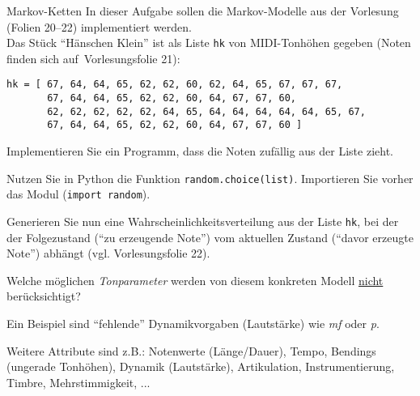 \documentclass{uebungsblatt}
\begin{document}
\begin{aufgabe}{Markov-Ketten}
	In dieser Aufgabe sollen die Markov-Modelle aus der Vorlesung (Folien 20--22) implementiert werden.\\
	Das Stück \enquote{Hänschen Klein} ist als Liste \texttt{hk} von MIDI-Tonhöhen gegeben (Noten finden sich auf~Vorlesungsfolie 21):
	\medskip
	
	\verb|hk = [ 67, 64, 64, 65, 62, 62, 60, 62, 64, 65, 67, 67, 67,|\\
	\verb|       67, 64, 64, 65, 62, 62, 60, 64, 67, 67, 60,|\\
	\verb|       62, 62, 62, 62, 62, 64, 65, 64, 64, 64, 64, 64, 65, 67,|\\
	\verb|       67, 64, 64, 65, 62, 62, 60, 64, 67, 67, 60 ]|
	\begin{teilaufgabe}
		Implementieren Sie ein Programm, dass die Noten zufällig aus der Liste zieht.
	\end{teilaufgabe}
	\begin{tipp}
		Nutzen Sie in Python die Funktion \texttt{random.choice(list)}. Importieren Sie vorher das Modul (\texttt{import random}).
	\end{tipp}

	\begin{teilaufgabe}
		Generieren Sie nun eine Wahrscheinlichkeitsverteilung aus der Liste \texttt{hk}, bei der der Folgezustand (\enquote{zu erzeugende Note}) vom aktuellen Zustand (\enquote{davor erzeugte Note}) abhängt (vgl. Vorlesungsfolie 22).
	\end{teilaufgabe}

	\begin{teilaufgabe}
		Welche möglichen \emph{Tonparameter} werden von diesem konkreten Modell \underline{nicht} berücksichtigt?
		\begin{tipp}
			Ein Beispiel sind \enquote{fehlende} Dynamikvorgaben (Lautstärke) wie \textit{mf} oder \textit{p}.
		\end{tipp}
		\begin{loesung}
			Weitere Attribute sind z.B.: Notenwerte (Länge/Dauer), Tempo, Bendings (ungerade Tonhöhen), Dynamik (Lautstärke), Artikulation, Instrumentierung, Timbre, Mehrstimmigkeit, ...
		\end{loesung}
	\end{teilaufgabe}
	
\end{aufgabe}
\end{document}
